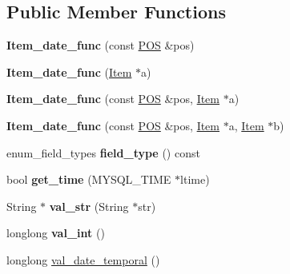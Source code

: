 \subsection*{Public Member Functions}
\begin{DoxyCompactItemize}
\item 
\mbox{\label{classItem__date__func_a9842b3225ff23158daed558b4ef2f98f}} 
{\bfseries Item\+\_\+date\+\_\+func} (const \mbox{\hyperlink{structYYLTYPE}{P\+OS}} \&pos)
\item 
\mbox{\label{classItem__date__func_a9e453b9e8818c7c51ec3734d5a3ae58a}} 
{\bfseries Item\+\_\+date\+\_\+func} (\mbox{\hyperlink{classItem}{Item}} $\ast$a)
\item 
\mbox{\label{classItem__date__func_ad9e866d01a1327c64bf04f736813d167}} 
{\bfseries Item\+\_\+date\+\_\+func} (const \mbox{\hyperlink{structYYLTYPE}{P\+OS}} \&pos, \mbox{\hyperlink{classItem}{Item}} $\ast$a)
\item 
\mbox{\label{classItem__date__func_a9f40381c9024ffbae83413ebc8e77bf7}} 
{\bfseries Item\+\_\+date\+\_\+func} (const \mbox{\hyperlink{structYYLTYPE}{P\+OS}} \&pos, \mbox{\hyperlink{classItem}{Item}} $\ast$a, \mbox{\hyperlink{classItem}{Item}} $\ast$b)
\item 
\mbox{\label{classItem__date__func_a60a1be92de01cdce053adcc5127e1223}} 
enum\+\_\+field\+\_\+types {\bfseries field\+\_\+type} () const
\item 
\mbox{\label{classItem__date__func_af4d2e3e5674ae0f1a2423f157723b397}} 
bool {\bfseries get\+\_\+time} (M\+Y\+S\+Q\+L\+\_\+\+T\+I\+ME $\ast$ltime)
\item 
\mbox{\label{classItem__date__func_a19ff0a4a159f98ac3030b398248ed3ae}} 
String $\ast$ {\bfseries val\+\_\+str} (String $\ast$str)
\item 
\mbox{\label{classItem__date__func_a9c838a0da42e7f82ff787faab05f0338}} 
longlong {\bfseries val\+\_\+int} ()
\item 
longlong \mbox{\hyperlink{classItem__date__func_a34f95de47fe9ff5bfe16fb641ec22a42}{val\+\_\+date\+\_\+temporal}} ()

\end{DoxyCompactItemize}
